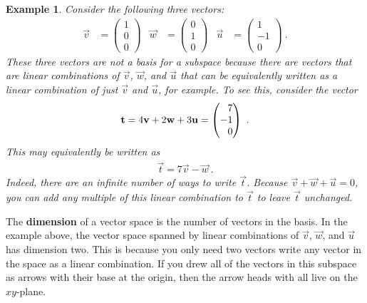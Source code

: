 \documentclass[12pt]{article}
\newtheorem{example}{Example}[section]
\begin{document}
\begin{example}\label{eg:over:specified:basis}
Consider the following three vectors:
\begin{align}
    \vec{v} &=
    \begin{pmatrix}
        1\\0\\0
    \end{pmatrix}
    &
    \vec{w} &=
    \begin{pmatrix}
        0\\1\\0
    \end{pmatrix}
    &
    \vec{u} &=
    \begin{pmatrix}
        1\\-1\\0
    \end{pmatrix} \ .
    \label{eq:tvu:example:basis}
\end{align}
These three vectors are \emph{not} a basis for a subspace because there are vectors that are linear combinations of $\vec{v}$, $\vec{w}$, and $\vec{u}$ that can be equivalently written as a linear combination of just $\vec{v}$ and $\vec{u}$, for example.
% 
To see this, consider the vector
\begin{align}
    \vec{t} = 4\vec{v} + 2\vec{w} + 3\vec{u} 
    =
    \begin{pmatrix}
        \pp 7 \\ -1 \\ \pp 0
    \end{pmatrix} \ .
\end{align}
This may equivalently be written as
\begin{align}
    \vec{t} = 7\vec{v} - \vec{w} \ .
\end{align}
Indeed, there are an infinite number of ways to write $\vec{t}$. Because $\vec{v} + \vec{w} + \vec{u} = 0$, you can add any multiple of this linear combination to $\vec{t}$ to leave $\vec{t}$ unchanged.
\end{example}

The \textbf{dimension} of a vector space is the number of vectors in the basis. In the example above, the vector space spanned by linear combinations of $\vec{v}$, $\vec{w}$, and $\vec{u}$ has dimension two. This is because you only need two vectors write any vector in the space as a linear combination. If you drew all of the vectors in this subspace as arrows with their base at the origin, then the arrow heads with all live on the $xy$-plane.
\end{document}

